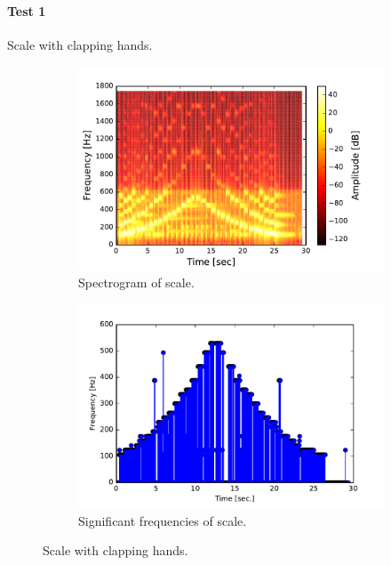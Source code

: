 \paragraph{Test 1} Scale with clapping hands.
\begin{figure}[H]
\centering
\begin{subfigure}{0.49\textwidth}
\centering
\includegraphics[width=\textwidth]{figures/validation/systemtest/final_spec.pdf}
\caption{Spectrogram of scale.}
\label{fig:final_spec1}
\end{subfigure}
\begin{subfigure}{0.49\textwidth}
\centering
\includegraphics[width=\textwidth]{figures/validation/systemtest/final_peak.pdf}
\caption{Significant frequencies of scale.}
\label{fig:final_peak1}
\end{subfigure}
\caption{Scale with clapping hands.}
\label{fig:final_1}
\end{figure} 

